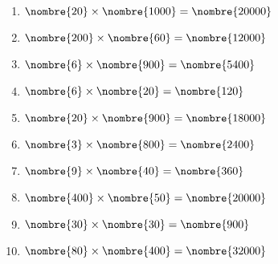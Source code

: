 \exo{}


\begin{enumerate}
	\item $\nombre{20} \times \nombre{1000}=\nombre{20000}$
	\item $\nombre{200} \times \nombre{60}=\nombre{12000}$
	\item $\nombre{6} \times \nombre{900}=\nombre{5400}$
	\item $\nombre{6} \times \nombre{20}=\nombre{120}$
	\item $\nombre{20} \times \nombre{900}=\nombre{18000}$
	\item $\nombre{3} \times \nombre{800}=\nombre{2400}$
	\item $\nombre{9} \times \nombre{40}=\nombre{360}$
	\item $\nombre{400} \times \nombre{50}=\nombre{20000}$
	\item $\nombre{30} \times \nombre{30}=\nombre{900}$
	\item $\nombre{80} \times \nombre{400}=\nombre{32000}$
\end{enumerate}

